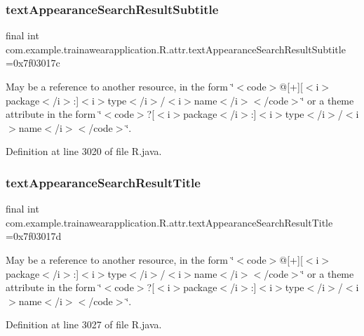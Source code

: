 \subsubsection{\texorpdfstring{textAppearanceSearchResultSubtitle}{textAppearanceSearchResultSubtitle}}
{\footnotesize\ttfamily final int com.\+example.\+trainawearapplication.\+R.\+attr.\+text\+Appearance\+Search\+Result\+Subtitle =0x7f03017c\hspace{0.3cm}{\ttfamily [static]}}

May be a reference to another resource, in the form \char`\"{}$<$code$>$@\mbox{[}+\mbox{]}\mbox{[}$<$i$>$package$<$/i$>$\+:\mbox{]}$<$i$>$type$<$/i$>$/$<$i$>$name$<$/i$>$$<$/code$>$\char`\"{} or a theme attribute in the form \char`\"{}$<$code$>$?\mbox{[}$<$i$>$package$<$/i$>$\+:\mbox{]}$<$i$>$type$<$/i$>$/$<$i$>$name$<$/i$>$$<$/code$>$\char`\"{}. 

Definition at line 3020 of file R.\+java.

\mbox{\label{classcom_1_1example_1_1trainawearapplication_1_1_r_1_1attr_a2c41f110250a5629332dde0437b0fb92}} 
\subsubsection{\texorpdfstring{textAppearanceSearchResultTitle}{textAppearanceSearchResultTitle}}
{\footnotesize\ttfamily final int com.\+example.\+trainawearapplication.\+R.\+attr.\+text\+Appearance\+Search\+Result\+Title =0x7f03017d\hspace{0.3cm}{\ttfamily [static]}}

May be a reference to another resource, in the form \char`\"{}$<$code$>$@\mbox{[}+\mbox{]}\mbox{[}$<$i$>$package$<$/i$>$\+:\mbox{]}$<$i$>$type$<$/i$>$/$<$i$>$name$<$/i$>$$<$/code$>$\char`\"{} or a theme attribute in the form \char`\"{}$<$code$>$?\mbox{[}$<$i$>$package$<$/i$>$\+:\mbox{]}$<$i$>$type$<$/i$>$/$<$i$>$name$<$/i$>$$<$/code$>$\char`\"{}. 

Definition at line 3027 of file R.\+java.

\mbox{\label{classcom_1_1example_1_1trainawearapplication_1_1_r_1_1attr_aca400d7ce7275da2f7cb6cd18040d351}} 
